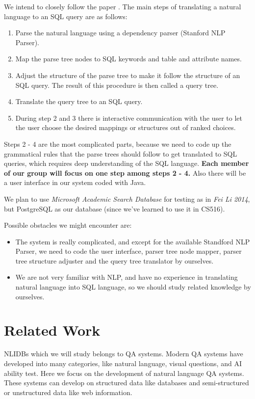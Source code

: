 \documentclass[twocolumn]{article}
\begin{document}
      We intend to closely follow the paper \cite{li2014}. The main steps of translating a natural language to an SQL query are as follows:

\begin{enumerate}
      \item Parse the natural language using a dependency parser (Stanford NLP Parser).
      \item Map the parse tree nodes to SQL keywords and table and attribute names.
      \item Adjust the structure of the parse tree to make it follow the structure of an SQL query. The result of this procedure is then called a query tree.
      \item Translate the query tree to an SQL query.
      \item During step 2 and 3 there is interactive communication with the user to let the user choose the desired mappings or structures out of ranked choices.
\end{enumerate}
        
Steps 2 - 4 are the most complicated parts, because we need to code up the grammatical rules that the parse trees should follow to get translated to SQL queries, which requires deep understanding of the SQL language. \textbf{Each member of our group will focus on one step among steps 2 - 4.} Also there will be a user interface in our system coded with Java.

We plan to use \textit{Microsoft Academic Search Database} for testing as in \textit{Fei Li 2014}, but PostgreSQL as our database (since we've learned to use it in CS516).
	
Possible obstacles we might encounter are:
\begin{itemize}
\item The system is really complicated, and except for the available Standford NLP Parser, we need to code the user interface, parser tree node mapper, parser tree structure adjuster and the query tree translator by ourselves.
\item We are not very familiar with NLP, and have no experience in translating natural language into SQL language, so we should study related knowledge by ourselves.
\end{itemize}

\section{Related Work}
NLIDBs which we will study belongs to QA systems. Modern QA systems have developed into many categories, like natural language, visual questions, and AI ability test. Here we focus on the development of natural language QA systems. These systems can develop on structured data like databases and semi-structured or unstructured data like web information. \cite{QATutorial}
      
\end{document}
